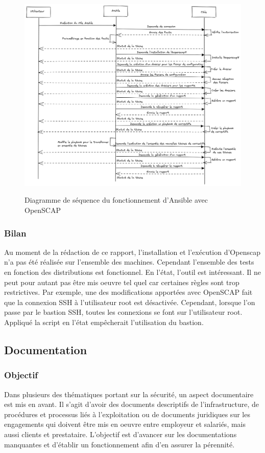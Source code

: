 \documentclass[12pt]{article}
\begin{document}
\begin{figure}[!ht]
    \centering
    \includegraphics[width=\textwidth]{src/graph_ansible_oscap.png}
    \label{fig:ansible_oscap}
    \caption{Diagramme de séquence du fonctionnement d'\gls{Ansible} avec OpenSCAP}
\end{figure}

\newpage
\subsubsection{Bilan}
Au moment de la rédaction de ce rapport, l'installation et l'exécution d'Openscap n'a pas été réalisée sur l'ensemble des machines. 
Cependant l'ensemble des tests en fonction des distributions est fonctionnel.
En l'état, l'outil est intéressant. 
Il ne peut pour autant pas être mis oeuvre tel quel car certaines règles sont trop restrictives.
Par exemple, une des modifications apportées avec \gls{OpenSCAP} fait que la connexion SSH à l'utilisateur root est désactivée.
Cependant, lorsque l'on passe par le bastion SSH, toutes les connexions se font sur l'utilisateur root.
Appliqué la script en l'état empêcherait l'utilisation du bastion.

\newpage
\subsection{Documentation}
\subsubsection{Objectif}
Dans plusieurs des thématiques portant sur la sécurité, un aspect documentaire est mis en avant. 
Il s'agit d'avoir des documents descriptifs de l'infrastructure, de procédures et processus liés à l'exploitation ou de documents juridiques sur les engagements qui doivent être mis en oeuvre entre employeur et salariés, mais aussi clients et prestataire. 
L'objectif est d'avancer sur les documentations manquantes et d'établir un fonctionnement afin d'en assurer la pérennité.
\end{document}
